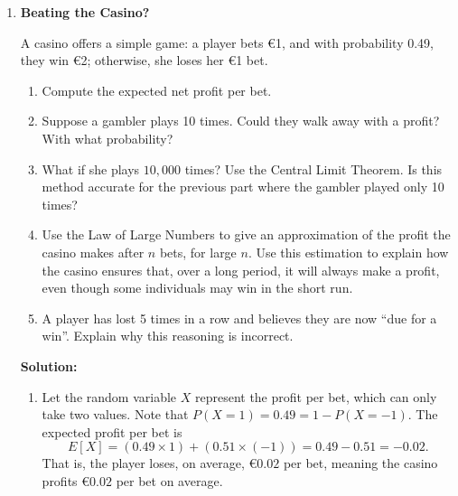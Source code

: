 \documentclass[12pt]{article}
\newif\ifsolutions
\begin{document}
\begin{enumerate}
\begin{enumerate}[label=(\alph*)]
        \item The approximate \(95\%\) confidence interval is
        \[
            6 \pm 1.96(2.30) \approx 6 \pm 4.51 = [1.49,\ 10.51].
        \]
        The interval does not include \(0\), which is consistent with rejecting \(H_0: \tau = 0\).

        \item No. Statistical significance means the estimated difference is large relative to sampling uncertainty. Substantive importance asks whether a \(6\)-point increase is meaningful for the research question, the cost of the prompt, and the decision context.
    \end{enumerate}
    \fi \color{black}

    \item \textbf{Beating the Casino?}

    A casino offers a simple game: a player bets €1, and with probability 0.49, they win €2; otherwise, she loses her €1 bet.

    \begin{enumerate}[label=(\alph*)]
        \item Compute the expected net profit per bet.
        \item Suppose a gambler plays 10 times. Could they walk away with a profit? With what probability? 
        \item What if she plays $10{,}000$ times? Use the Central Limit Theorem. Is this method accurate for the previous part where the gambler played only 10 times?
        \item Use the Law of Large Numbers to give an approximation of the profit the casino makes after $n$ bets, for large $n$. Use this estimation to explain how the casino ensures that, over a long period, it will always make a profit, even though some individuals may win in the short run.
        \item A player has lost 5 times in a row and believes they are now ``due for a win''. Explain why this reasoning is incorrect.
    \end{enumerate}

    
    \ifsolutions \color{blue} \textbf{Solution:} \\
    \begin{enumerate}
        \item Let the random variable $X$ represent the profit per bet, which can only take two values. Note that $P(X = 1) = 0.49 = 1- P(X=-1)$. The expected profit per bet is
        \[
        E[X] = (0.49 \times 1) + (0.51 \times (-1)) = 0.49 - 0.51 = -0.02.
        \]
        That is, the player loses, on average, €$0.02$ per bet, meaning the casino profits €$0.02$ per bet on average.
        

\end{enumerate}
\end{enumerate}
\end{document}
